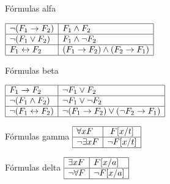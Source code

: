 \documentclass{beamer}
\begin{document}
\begin{frame}[fragile]
\begin{center}
  Fórmulas alfa
\vspace{5mm}


   $\begin{array}{|l|l| } \hline
     \neg (F_1 \rightarrow F_2) & F_1 \wedge F_2               \\ \hline
     \neg(F_1 \vee F_2)         & F_1 \wedge \neg F_2          \\ \hline
     F_1 \leftrightarrow F_2    & (F_1 \rightarrow F_2) \wedge 
                                  (F_2 \rightarrow F_1)        \\ \hline
   \end{array}$
   \vspace{5mm}

Fórmulas beta

\vspace{5mm}
   $\begin{array}{|l|l|} \hline
    F_1 \rightarrow F_2             & \neg F_1 \vee F_2                \\ \hline
    \neg (F_1 \wedge F_2)           & \neg F_1 \vee \neg F_2           \\ \hline
    \neg (F_1 \leftrightarrow F_2)  & \neg (F_1 \rightarrow F_2 ) \vee 
                                      (\neg F_2 \rightarrow F_1)       \\ \hline
    \end{array}$

    \vspace{3mm}
    Fórmulas gamma \quad
    $\begin{array}{|l|c|} \hline
    \forall x F      & F [x/t]       \\ \hline
    \neg \exists x F & \neg F [x/t ] \\ \hline
     \end{array}$
     \vspace{3mm}

     Fórmulas delta \quad 
      $\begin{array}{|l|l|} \hline
    \exists x F    & F[x / a]       \\ \hline
    \neg \forall F & \neg F [x / a] \\ \hline
  \end{array}$
    
\end{center}    
\end{frame}
\end{document}
